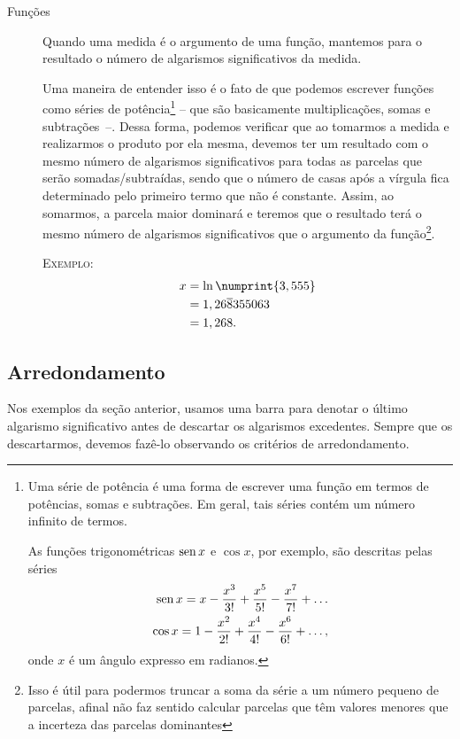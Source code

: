\begin{description}
\item[Funções] Quando uma medida é o argumento de uma função, mantemos para o resultado o número de algarismos significativos da medida. 

Uma maneira de entender isso é o fato de que podemos escrever funções como séries de potência\footnote{Uma série de potência é uma forma de escrever uma função em termos de potências, somas e subtrações. Em geral, tais séries contém um número infinito de termos.

As funções trigonométricas $\operatorname{sen} x$ e $\cos x$, por exemplo, são descritas pelas séries
\begin{align*}
	\operatorname{sen} x = x - \frac{x^3}{3!} + \frac{x^5}{5!} - \frac{x^7}{7!} + \dots \\
	\cos x = 1 - \frac{x^2}{2!} + \frac{x^4}{4!} - \frac{x^6}{6!} + \dots,
\end{align*}
%
onde $x$ é um ângulo expresso em radianos.
} -- que são basicamente multiplicações, somas e subtrações~--. Dessa forma, podemos verificar que ao tomarmos a medida e realizarmos o produto por ela mesma, devemos ter um resultado com o mesmo número de algarismos significativos para todas as parcelas que serão somadas/subtraídas, sendo que o número de casas após a vírgula fica determinado pelo primeiro termo que não é constante. Assim, ao somarmos, a parcela maior dominará e teremos que o resultado terá o mesmo número de algarismos significativos que o argumento da função\footnote{Isso é útil para podermos truncar a soma da série a um número pequeno de parcelas, afinal não faz sentido calcular parcelas que têm valores menores que a incerteza das parcelas dominantes}.

\textsc{Exemplo:}
\begin{align}
	x &= \ln \numprint{3,555} \\
	&= 1,26\overline{8}355063 \\
	&= 1,268.
\end{align}
\end{description}

\subsection{Arredondamento}

Nos exemplos da seção anterior, usamos uma barra para denotar o último algarismo significativo antes de descartar os algarismos excedentes. Sempre que os descartarmos, devemos fazê-lo observando os critérios de arredondamento.

